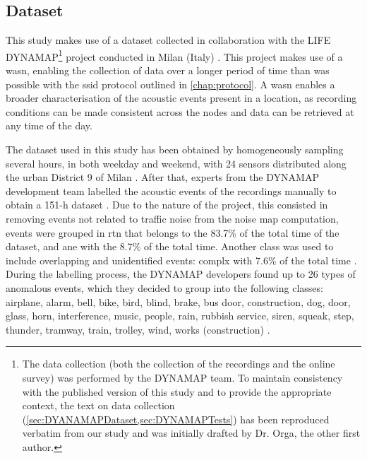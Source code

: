 
\subsection{Dataset}
\label{sec:DYANAMAPDataset}
This study makes use of a dataset collected in collaboration with the LIFE DYNAMAP\footnote{The data collection (both the collection of the recordings and the online survey) was performed by the DYNAMAP team. To maintain consistency with the published version of this study and to provide the appropriate context, the text on data collection (\cref{sec:DYANAMAPDataset,sec:DYNAMAPTests}) has been reproduced verbatim from our study \citep{Orga2021Multilevel} and was initially drafted by Dr. Orga, the other first author.} project conducted in Milan (Italy) \citep{Sevillano2016DYNAMAP,Alias2020WASN}. This project makes use of a \gls{wasn}, enabling the collection of data over a longer period of time than was possible with the \gls{ssid} protocol outlined in \cref{chap:protocol}. A \gls{wasn} enables a broader characterisation of the acoustic events present in a location, as recording conditions can be made consistent across the nodes and data can be retrieved at any time of the day.

The dataset used in this study has been obtained by homogeneously sampling several hours, in both weekday and weekend, with 24 sensors distributed along the urban District 9 of Milan \citep{AlsinaPages2018Detection}. After that, experts from the DYNAMAP development team labelled the acoustic events of the recordings manually to obtain a 151-h dataset \citep{Alias2020WASN}. Due to the nature of the project, this consisted in removing events not related to traffic noise from the noise map computation, events were grouped in \gls{rtn} that belongs to the 83.7\% of the total time of the dataset, and \gls{ane} with the 8.7\% of the total time. Another class was used to include overlapping and unidentified events: \gls{complx} with 7.6\% of the total time \citep{Alias2020Aggregate}. During the labelling process, the DYNAMAP developers found up to 26 types of anomalous events, which they decided to group into the following classes: airplane, alarm, bell, bike, bird, blind, brake, bus door, construction, dog, door, glass, horn, interference, music, people, rain, rubbish service, siren, squeak, step, thunder, tramway, train, trolley, wind, works (construction) \citep{Alias2017Description}.

